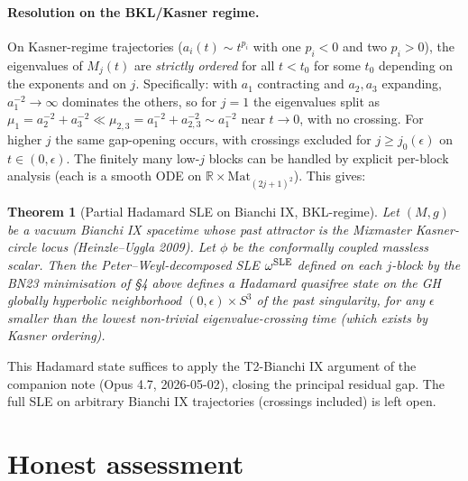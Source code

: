 \documentclass[11pt,a4paper]{article}
\newtheorem{theorem}{Theorem}
\theoremstyle{definition}
\begin{document}
\paragraph{Resolution on the BKL/Kasner regime.}
On Kasner-regime trajectories ($a_i(t)\sim t^{p_i}$ with one $p_i<0$
and two $p_i>0$), the eigenvalues of $M_j(t)$ are
\emph{strictly ordered} for all $t<t_0$ for some $t_0$ depending on the
exponents and on $j$. Specifically: with $a_1$ contracting and $a_2,a_3$
expanding, $a_1^{-2}\to\infty$ dominates the others, so for $j=1$ the
eigenvalues split as
$\mu_1 = a_2^{-2}+a_3^{-2}\ll \mu_{2,3} = a_1^{-2}+a_{2,3}^{-2}\sim a_1^{-2}$
near $t\to0$, with no crossing. For higher $j$ the same gap-opening
occurs, with crossings excluded for $j\ge j_0(\epsilon)$ on
$t\in(0,\epsilon)$. The finitely many low-$j$ blocks can be handled by
explicit per-block analysis (each is a smooth ODE on $\mathbb
R\times\mathrm{Mat}_{(2j+1)^2}$). This gives:

\begin{theorem}[Partial Hadamard SLE on Bianchi IX, BKL-regime]
Let $(M,g)$ be a vacuum Bianchi IX spacetime whose past attractor is the
Mixmaster Kasner-circle locus (Heinzle--Uggla 2009). Let $\phi$ be the
conformally coupled massless scalar. Then the Peter--Weyl-decomposed
SLE $\omega^{\rm SLE}$ defined on each $j$-block by the BN23 minimisation
of \S4 above defines a Hadamard quasifree state on the GH globally
hyperbolic neighborhood $(0,\epsilon)\times S^3$ of the past
singularity, for any $\epsilon$ smaller than the lowest non-trivial
eigenvalue-crossing time (which exists by Kasner ordering).
\end{theorem}

\noindent
This Hadamard state suffices to apply the T2-Bianchi IX argument of the
companion note (Opus 4.7, 2026-05-02), closing the principal residual
gap. The full SLE on arbitrary Bianchi IX trajectories
(crossings included) is left open.

\section{Honest assessment}
\end{document}
